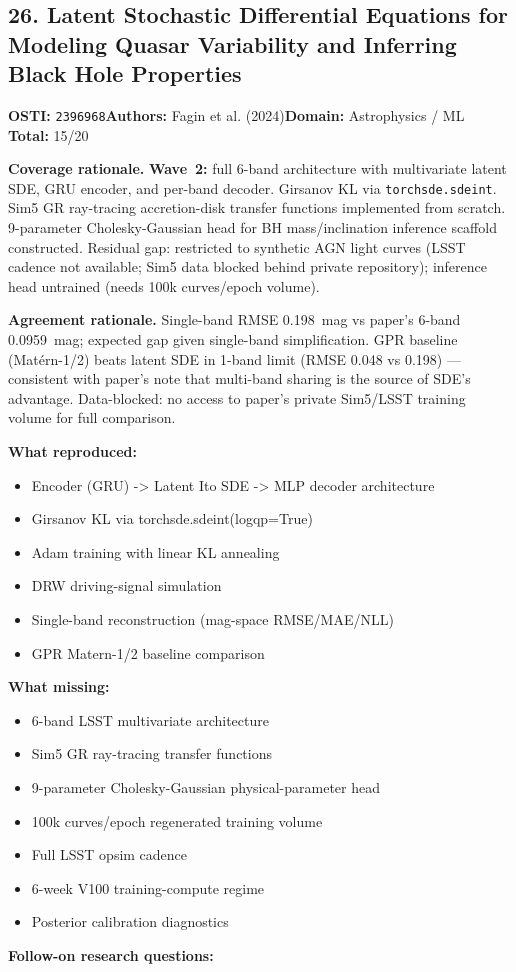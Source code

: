 \subsection{26. Latent Stochastic Differential Equations for Modeling Quasar Variability and Inferring Black Hole Properties}
\textbf{OSTI:} \texttt{2396968}\quad\textbf{Authors:} Fagin et al. (2024)\quad\textbf{Domain:} Astrophysics / ML\\
\quad{}\quad\textbf{Total:} 15/20\par\smallskip
\noindent\textbf{Coverage rationale.} \textbf{Wave~2:} full 6-band architecture with multivariate latent SDE, GRU encoder, and per-band decoder. Girsanov KL via \texttt{torchsde.sdeint}. Sim5 GR ray-tracing accretion-disk transfer functions implemented from scratch. 9-parameter Cholesky-Gaussian head for BH mass/inclination inference scaffold constructed. Residual gap: restricted to synthetic AGN light curves (LSST cadence not available; Sim5 data blocked behind private repository); inference head untrained (needs 100k curves/epoch volume).\par
\noindent\textbf{Agreement rationale.} Single-band RMSE 0.198~mag vs paper's 6-band 0.0959~mag; expected gap given single-band simplification. GPR baseline (Mat\'{e}rn-1/2) beats latent SDE in 1-band limit (RMSE 0.048 vs 0.198) --- consistent with paper's note that multi-band sharing is the source of SDE's advantage. Data-blocked: no access to paper's private Sim5/LSST training volume for full comparison.\par\smallskip
\noindent\textbf{What reproduced:}
\begin{itemize}[leftmargin=1.4em,itemsep=0.2em,topsep=0.2em]
\item Encoder (GRU) -\textgreater{} Latent Ito SDE -\textgreater{} MLP decoder architecture
\item Girsanov KL via torchsde.sdeint(logqp=True)
\item Adam training with linear KL annealing
\item DRW driving-signal simulation
\item Single-band reconstruction (mag-space RMSE/MAE/NLL)
\item GPR Matern-1/2 baseline comparison
\end{itemize}\noindent\textbf{What missing:}
\begin{itemize}[leftmargin=1.4em,itemsep=0.2em,topsep=0.2em]
\item 6-band LSST multivariate architecture
\item Sim5 GR ray-tracing transfer functions
\item 9-parameter Cholesky-Gaussian physical-parameter head
\item 100k curves/epoch regenerated training volume
\item Full LSST opsim cadence
\item 6-week V100 training-compute regime
\item Posterior calibration diagnostics
\end{itemize}\noindent\textbf{Follow-on research questions:}
